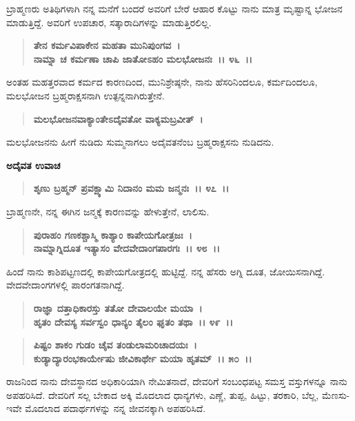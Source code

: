 ಬ್ರಾಹ್ಮಣರು ಅತಿಥಿಗಳಾಗಿ ನನ್ನ ಮನೆಗೆ ಬಂದರೆ ಅವರಿಗೆ ಬೇರೆ ಆಹಾರ ಕೊಟ್ಟು ನಾನು ಮಾತ್ರ ಮೃಷ್ಟಾನ್ನ ಭೋಜನ ಮಾಡುತ್ತಿದ್ದೆ. ಅವರಿಗೆ ಉಪಚಾರ, ಸತ್ಕಾರಾದಿಗಳನ್ನು ಮಾಡು\break ತ್ತಿರಲಿಲ್ಲ.

\begin{verse}
\textbf{ತೇನ ಕರ್ಮವಿಪಾಕೇನ ಮಹತಾ ಮುನಿಪುಂಗವ~।}\\\textbf{ನಾಮ್ನಾ ಚ ಕರ್ಮಣಾ ಚಾಪಿ ಜಾತೋಽಹಂ ಮಲಭೋಜನಃ~।। ೪೬~।।}
\end{verse}

ಅಂತಹ ಮಹತ್ತರವಾದ ಕರ್ಮದ ಕಾರಣದಿಂದ, ಮುನಿಶ್ರೇಷ್ಠನೇ, ನಾನು ಹೆಸರಿನಿಂದಲೂ, ಕರ್ಮದಿಂದಲೂ, ಮಲಭೋಜನ ಬ್ರಹ್ಮರಾಕ್ಷಸನಾಗಿ ಉತ್ಪನ್ನನಾಗಿರುತ್ತೇನೆ.

\begin{verse}
\textbf{ಮಲಭೋಜನವಾಕ್ಯಾಂತೇಽದೈವತೋ ವಾಕ್ಯಮಬ್ರವೀತ್~।}
\end{verse}

ಮಲಭೋಜನನು ಹೀಗೆ ನುಡಿದು ಸುಮ್ಮನಾಗಲು ಅದೈವತನೆಂಬ ಬ್ರಹ್ಮರಾಕ್ಷಸನು ನುಡಿದನು.

\newpage

\begin{flushleft}
\textbf{ಅದೈವತ ಉವಾಚ\enginline{-}}
\end{flushleft}

\begin{verse}
\textbf{ಶೃಣು ಬ್ರಹ್ಮನ್ ಪ್ರವಕ್ಷ್ಯಾಮಿ ನಿದಾನಂ ಮಮ ಜನ್ಮನಃ~।। ೪೭~।।}
\end{verse}

ಬ್ರಾಹ್ಮಣನೇ, ನನ್ನ ಈಗಿನ ಜನ್ಮಕ್ಕೆ ಕಾರಣವನ್ನು ಹೇಳುತ್ತೇನೆ, ಲಾಲಿಸು.

\begin{verse}
\textbf{ಪುರಾಹಂ ಗಣಕಶ್ಚಾಸ್ಮಿ ಕಾಶ್ಯಾಂ ಕಾಪೇಯಗೋತ್ರಜಃ~।}\\\textbf{ನಾಮ್ನಾಗ್ನಿದೂತ ಇತ್ಯಾಸಂ ವೇದವೇದಾಂಗಪಾರಗಃ~।। ೪೮~।।}
\end{verse}

ಹಿಂದೆ ನಾನು ಕಾಶಿಪಟ್ಟಣದಲ್ಲಿ ಕಾಪೇಯಗೋತ್ರದಲ್ಲಿ ಹುಟ್ಟಿದ್ದೆ. ನನ್ನ ಹೆಸರು ಅಗ್ನಿ ದೂತ, ಜೋಯಿಸನಾಗಿದ್ದೆ. ವೇದವೇದಾಂಗಗಳಲ್ಲಿ ಪಾರಂಗತನಾಗಿದ್ದೆ.

\begin{verse}
\textbf{ರಾಜ್ಞಾ ದತ್ತಾಧಿಕಾರಸ್ತು ತತೋ ದೇವಾಲಯೇ ಮಯಾ~।}\\\textbf{ಹೃತಂ ದೇವಸ್ಯ ಸರ್ವಸ್ವಂ ಧಾನ್ಯಂ ತೈಲಂ ಘೃತಂ ತಥಾ~।। ೪೯~।। }
\end{verse}

\begin{verse}
\textbf{ಪಿಷ್ಟಂ ಶಾಕಂ ಗುಡಂ ಚೈವ ತಂಡುಲಾಮರಿಚಾದಯಃ~।}\\\textbf{ಕುಡ್ಯಾದ್ಯಾರಂಭಕಾರ್ಯೇಷು ಜೀವಿಕಾರ್ಥೇ ಮಯಾ ಹೃತಮ್~।। ೫೦~।।}
\end{verse}

ರಾಜನಿಂದ ನಾನು ದೇವಸ್ಥಾನದ ಅಧಿಕಾರಿಯಾಗಿ ನೇಮಿತನಾದೆ, ದೇವರಿಗೆ ಸಂಬಂಧಪಟ್ಟ ಸಮಸ್ತ ವಸ್ತುಗಳನ್ನೂ ನಾನು ಅಪಹರಿಸಿದೆ. ದೇವರಿಗೆ ಸಲ್ಲ ಬೇಕಾದ ಅಕ್ಕಿ ಮೊದಲಾದ ಧಾನ್ಯಗಳು, ಎಣ್ಣೆ, ತುಪ್ಪ, ಹಿಟ್ಟು, ತರಕಾರಿ, ಬೆಲ್ಲ, ಮೆಣಸು-ಇವೇ ಮೊದಲಾದ ಪದಾರ್ಥಗಳನ್ನು ನನ್ನ ಜೀವನಕ್ಕಾಗಿ ಅಪಹರಿಸಿದೆ.

